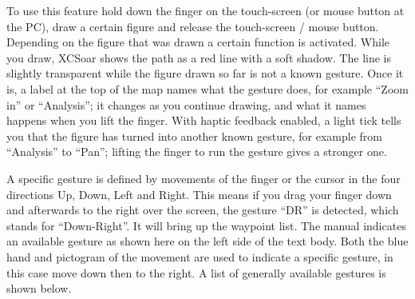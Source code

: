 To use this feature hold down the finger on the 
touch-screen (or mouse button at the PC), draw a certain figure and release 
the touch-screen / mouse button. Depending on the figure that was drawn 
a certain function is activated. 
While you draw, XCSoar shows the path as a red line with a soft
shadow.  The line is slightly transparent while the figure drawn so
far is not a known gesture.  Once it is, a label at the top of the map names
what the gesture does, for example ``Zoom in'' or ``Analysis''; it
changes as you continue drawing, and what it names happens when you
lift the finger.  With haptic feedback enabled, a light tick tells you
that the figure has turned into another known gesture, for example
from ``Analysis'' to ``Pan''; lifting the finger to run the gesture
gives a stronger one.

A specific gesture is defined by movements of the finger or the 
cursor in the four directions Up, Down, Left and Right. This means if 
you drag your finger down and afterwards to the right over the screen, 
 the gesture ``DR'' is detected, which stands for ``Down-Right''.
It will bring up the waypoint list. The manual indicates an available 
gesture as shown here on the left side of the text body. Both the blue hand 
and pictogram of the movement are used to indicate a specific gesture, in this 
case move down then to the right. A list of generally available gestures is 
shown below. 
\vspace{2em}

